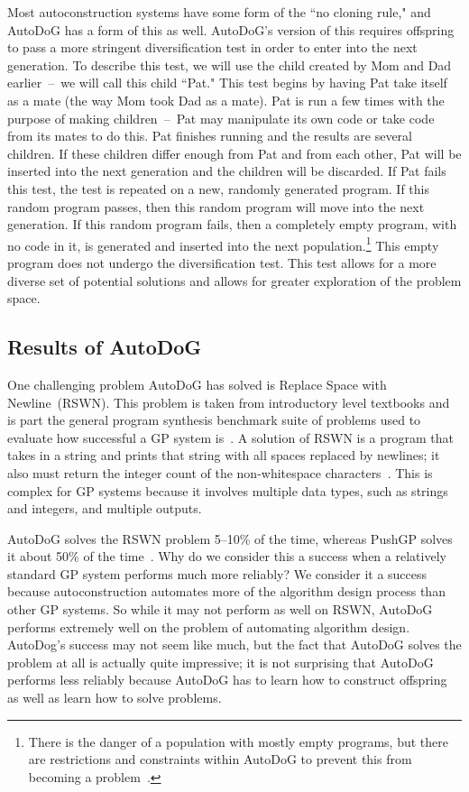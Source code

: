 \documentclass{sig-alternate}
\begin{document}
Most autoconstruction systems have some form of the ``no cloning rule," and AutoDoG has a form of this as well. AutoDoG's version of this requires offspring to pass a more stringent diversification test in order to enter into the next generation. To describe this test, we will use the child created by Mom and Dad earlier~--~we will call this child ``Pat." This test begins by having Pat take itself as a mate (the way Mom took Dad as a mate). Pat is run a few times with the purpose of making children~--~Pat may manipulate its own code or take code from its mates to do this. Pat finishes running and the results are several children. If these children differ enough from Pat and from each other, Pat will be inserted into the next generation and the children will be discarded. If Pat fails this test, the test is repeated on a new, randomly generated program. If this random program passes, then this random program will move into the next generation. If this random program fails, then a completely empty program, with no code in it, is generated and inserted into the next population.\footnote{There is the danger of a population with mostly empty programs, but there are restrictions and constraints within AutoDoG to prevent this from becoming a problem~\cite{spector:2016}.} This empty program does not undergo the diversification test.
This test allows for a more diverse set of potential solutions and allows for greater exploration of the problem space.~\cite{spector:2016}

\subsection{Results of AutoDoG}
\label{sec:results}
One challenging problem AutoDoG has solved is Replace Space with Newline~(RSWN). This problem is taken from introductory level textbooks and is part the general program synthesis benchmark suite of problems used to evaluate how successful a GP system is~\cite{helmuth:2015}. A solution of RSWN is a program that takes in a string and prints that string with all spaces replaced by newlines; it also must return the integer count of the non-whitespace characters~\cite{helmuth:2015}. This is complex for GP systems because it involves multiple data types, such as strings and integers, and multiple outputs.

AutoDoG solves the RSWN problem 5--10\% of the time, whereas PushGP solves it about 50\% of the time~\cite{helmuth:2015}. Why do we consider this a success when a relatively standard GP system performs much more reliably? We consider it a success because autoconstruction automates more of the algorithm design process than other GP systems. So while it may not perform as well on RSWN, AutoDoG performs extremely well on the problem of automating algorithm design. AutoDog's success may not seem like much, but the fact that AutoDoG solves the problem at all is actually quite impressive; it is not surprising that AutoDoG performs less reliably because AutoDoG has to learn how to construct offspring as well as learn how to solve problems.
\end{document}
